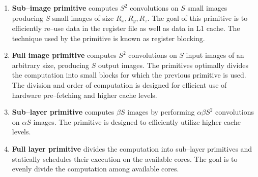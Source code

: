   \begin{enumerate}
  \item {\bf Sub--image primitive} computes $S^2$ convolutions on $S$
    small images producing $S$ small images of size $R_x, R_y, R_z$.
    The goal of this primitive is to efficiently re--use data in the
    register file as well as data in L1 cache.  The technique used by
    the primitive is known as register blocking.
  \item {\bf Full image primitive} computes $S^2$ convolutions on $S$
    input images of an arbitrary size, producing $S$ output images.
    The primitives optimally divides the computation into small blocks
    for which the previous primitive is used.  The division and order
    of computation is designed for efficient use of hardware
    pre--fetching and higher cache levels.
  \item {\bf Sub--layer primitive} computes $\beta S$ images by
    performing $\alpha \beta S^2$ convolutions on $\alpha S$ images.
    The primitive is designed to efficiently utilize higher cache
    levels.
  \item {\bf Full layer primitive} divides the computation into
    sub--layer primitives and statically schedules their execution on
    the available cores.  The goal is to evenly divide the computation
    among available cores.
  \end{enumerate}


